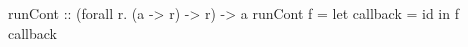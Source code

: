\begin{code}
runCont :: (forall r. (a -> r) -> r) -> a
runCont f =
  let callback = id
   in f callback
\end{code}
